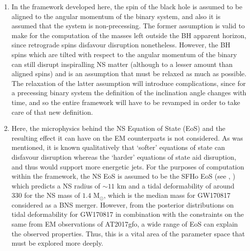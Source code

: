         \begin{enumerate}

            \item In the framework developed here, the spin of the black hole is
                assumed to be aligned to the angular momentum of the binary system, and
                also it is assumed that the system is non-precessing. The former
                assumption is valid to make for the computation of the masses left
                outside the BH apparent horizon, since retrograde spins disfavour
                disruption nonetheless. However, the BH spins which are tilted with
                respect to the angular momentum of the binary can still disrupt
                inspiralling NS matter (although to a lesser amount than aligned spins)
                and is an assumption that must be relaxed as much as possible. The
                relaxation of the latter assumption will introduce complications, since
                for a precessing binary system the definition of the inclination angle
                changes with time, and so the entire framework will have to be revamped
                in order to take care of that new definition.

            \item Here, the microphysics behind the NS Equation of State (EoS) and the
                resulting effect it can have on the EM counterparts is not considered.
                As was mentioned, it is known qualitatively that `softer' equations of
                state can disfavour disruption whereas the `harder' equations of state
                aid disruption, and thus would support more energetic jets. For the
                purposes of computation within the framework, the NS EoS is assumed to
                be the SFHo EoS (see \cite{hempel_2010}, \cite{hempel_2012}) which
                predicts a NS radius of $\sim 11$ km and a tidal deformability of around
                330 for the NS mass of $1.4$ M$_\odot$, which is the median mass for
                GW170817 considered as a BNS merger. However, from the posterior
                distributions on tidal deformability for GW170817 in combination with
                the constraints on the same from EM observations of AT2017gfo, a wide
                range of EoS can explain the observed properties. Thus, this is a vital
                area of the parameter space that must be explored more deeply.


\end{enumerate}
